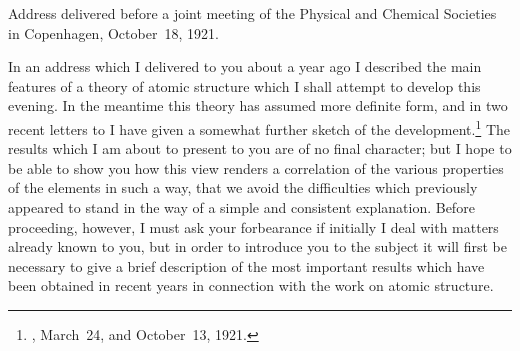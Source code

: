 {Address delivered before a joint meeting of the Physical and Chemical
Societies in Copenhagen, October~18, 1921.}


In an address which I delivered to you about a year ago I
described the main features of a theory of atomic structure which
I shall attempt to develop this evening. In the meantime this
theory has assumed more definite form, and in two recent letters
to  I have given a somewhat further sketch of the development.\footnote
  {, March~24, and October~13, 1921.}
The results which I am about to present to you are
of no final character; but I hope to be able to show you how this
view renders a correlation of the various properties of the elements
in such a way, that we avoid the difficulties which previously
appeared to stand in the way of a simple and consistent explanation.
Before proceeding, however, I must ask your forbearance if initially
I deal with matters already known to you, but in order to introduce
you to the subject it will first be necessary to give a brief
description of the most important results which have been obtained
in recent years in connection with the work on atomic structure.

